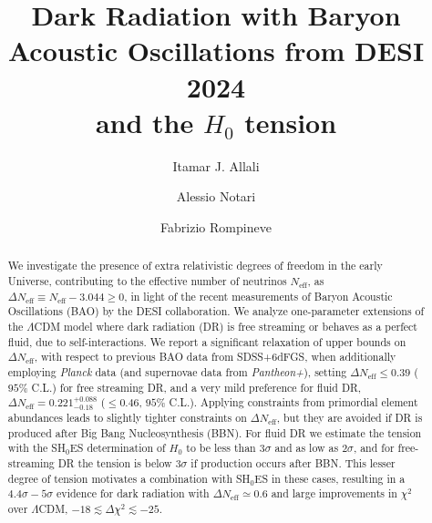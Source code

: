 \documentclass[aps,prd,twocolumn,notitlepage,
superscriptaddress,
nofootinbib,floatfix]{revtex4-2}
\begin{document}
\title{
Dark Radiation with Baryon Acoustic Oscillations from DESI 2024\\ 
 and the $H_0$ tension \\
}

\author{Itamar J. Allali} 

\author{Alessio Notari} 


\author{Fabrizio Rompineve} 

\begin{abstract}
\noindent We investigate the presence of extra relativistic degrees of freedom in the early Universe, contributing to the effective number of neutrinos $N_\text{eff}$, as $\Delta N_\text{eff}\equiv N_\text{eff}-3.044\geq 0$, in light of the recent measurements of Baryon Acoustic Oscillations (BAO) by the DESI collaboration. We analyze one-parameter extensions of the $\Lambda$CDM model where dark radiation (DR) is free streaming or behaves as a perfect fluid, due to self-interactions. We report a significant relaxation of upper bounds on $\Delta N_\text{eff}$, with respect to previous BAO data from SDSS+6dFGS, when additionally employing \emph{Planck} data (and supernovae data from \emph{Pantheon+}), setting $\Delta N_\text{eff}\leq 0.39$ ($95\%$ C.L.) for free streaming DR, and a very mild preference for fluid DR, $\Delta N_\text{eff} = 0.221^{+0.088}_{-0.18}$ ($\leq 0.46$, $95\%$ C.L.).  
Applying constraints from primordial element abundances leads to slightly tighter constraints on $\Delta N_\text{eff}$, but they
are avoided if DR is produced after Big Bang Nucleosynthesis (BBN).
For fluid DR we estimate the tension with the SH$_0$ES determination of $H_0$ to be less than $3\sigma$ and as low as $2\sigma$,
and for free-streaming DR the tension is below $3\sigma$ if production occurs after BBN. This lesser degree of tension motivates a combination with SH$_0$ES in these cases, 
resulting in a $4.4\sigma-5\sigma$ evidence for dark radiation with $\Delta N_\text{eff}\simeq 0.6$ and large improvements in $\chi^2$ over $\Lambda$CDM, $-18\lesssim \Delta \chi^2\lesssim -25$. 
\end{abstract}
\end{document}
